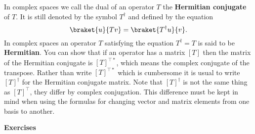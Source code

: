 In complex spaces we call the dual of an operator $T$ the \textbf{Hermitian conjugate} of $T$.  It is still denoted by the symbol $T^{\dag}$ and defined by the equation
\begin{displaymath} \braket{u}{Tv} = \braket{T^{\dag}u}{v}. \end{displaymath}
In complex spaces an operator $T$ satisfying the equation $T^{\dag} = T$ is said to be \textbf{Hermitian}.  You can show that if an operator has a matrix $[T]$ then the matrix of the Hermitian conjugate is $[T]^{\top *}$, which means the complex conjugate of the transpose.  Rather than write $[T]^{\top *}$ which is cumbersome it is usual to write $[T]^{\dag}$ for the Hermitian conjugate matrix.  Note that $[T]^{\dag}$ is not the same thing as $[T]^{\top}$, they differ by complex conjugation.  This difference must be kept in mind when using the formulas for changing vector and matrix elements from one basis to another. 

\begin{flushleft}\textbf{Exercises}\end{flushleft}
